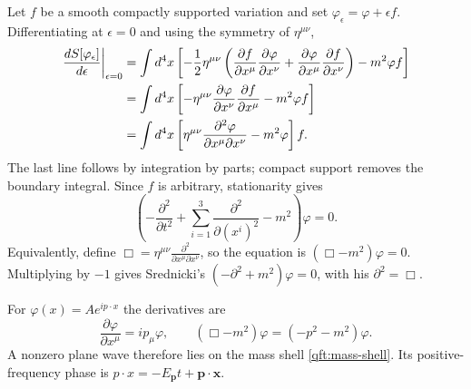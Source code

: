 Let $f$ be a smooth compactly supported variation and set
$\varphi_\epsilon=\varphi+\epsilon f$. Differentiating at $\epsilon=0$
and using the symmetry of $\eta^{\mu\nu}$,
\begin{align}
 \left.\frac{dS[\varphi_\epsilon]}{d\epsilon}\right|_{\epsilon=0}
 &=\int d^4x\left[
 -\frac12\eta^{\mu\nu}\left(
 \frac{\partial f}{\partial x^\mu}
 \frac{\partial\varphi}{\partial x^\nu}
 +\frac{\partial\varphi}{\partial x^\mu}
 \frac{\partial f}{\partial x^\nu}\right)-m^2\varphi f\right]\notag\\
 &=\int d^4x\left[
 -\eta^{\mu\nu}\frac{\partial\varphi}{\partial x^\nu}
                \frac{\partial f}{\partial x^\mu}-m^2\varphi f\right]
 \notag\\
 &=\int d^4x\left[
 \eta^{\mu\nu}\frac{\partial^2\varphi}
 {\partial x^\mu\partial x^\nu}-m^2\varphi\right]f.
 \label{qft:scalar-variation}
\end{align}
The last line follows by integration by parts; compact support removes the
boundary integral. Since $f$ is arbitrary, stationarity gives
\begin{equation}\label{qft:klein-gordon}
 \left(-\frac{\partial^2}{\partial t^2}
 +\sum_{i=1}^3\frac{\partial^2}{\partial (x^i)^2}-m^2\right)
 \varphi=0 .
\end{equation}
Equivalently, define
$\Box=\eta^{\mu\nu}\frac{\partial^2}
{\partial x^\mu\partial x^\nu}$, so the equation is
$(\Box-m^2)\varphi=0$. Multiplying by $-1$ gives Srednicki's
$(-\partial^2+m^2)\varphi=0$, with his $\partial^2=\Box$.

For $\varphi(x)=A e^{ip\cdot x}$ the derivatives are
\begin{equation}\label{qft:plane-wave}
 \frac{\partial\varphi}{\partial x^\mu}=ip_\mu\varphi,
 \qquad
 (\Box-m^2)\varphi=(-p^2-m^2)\varphi .
\end{equation}
A nonzero plane wave therefore lies on the mass shell
\eqref{qft:mass-shell}. Its positive-frequency phase is
$p\cdot x=-E_{\mathbf p}t+\mathbf p\cdot\mathbf x$.

